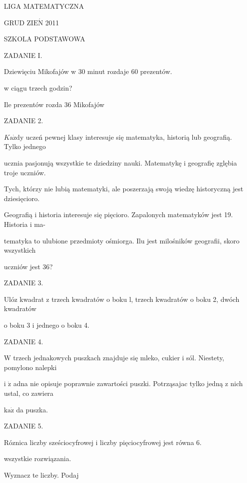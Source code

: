 \documentclass[a4paper,12pt]{article}
\begin{document}
LIGA MATEMATYCZNA

GRUD Z$\mathrm{I}\mathrm{E}\acute{\mathrm{N}}$ 2011

SZKOLA PODSTAWOWA

ZADANIE I.

Dziewięciu Mikofajów w 30 minut rozdaje 60 prezentów.

w ciągu trzech godzin?

Ile prezentów rozda 36 Mikofajów

ZADANIE 2.

$K\mathrm{a}\dot{\mathrm{z}}\mathrm{d}\mathrm{y}$ uczeń pewnej klasy interesuje się matematyka, historią lub geografią. Tylko jednego

ucznia pasjonują wszystkie te dziedziny nauki. Matematykę i geografię zglębia troje uczniów.

Tych, którzy nie lubią matematyki, ale poszerzają swoją wiedzę historyczną jest dziesięcioro.

Geografią i historia interesuje się pięcioro. Zapalonych matematyków jest 19. Historia i ma-

tematyka to ulubione przedmioty ośmiorga. Ilu jest milośników geografii, skoro wszystkich

uczniów jest 36?

ZADANIE 3.

Ulóz kwadrat z trzech kwadratów o boku l, trzech kwadratów o boku 2, dwóch kwadratów

o boku 3 i jednego o boku 4.

ZADANIE 4.

$\mathrm{W}$ trzech jednakowych puszkach znajduje się mleko, cukier i sól. Niestety, pomylono nalepki

i $\dot{\mathrm{z}}$ adna nie opisuje poprawnie zawartości puszki. Potrząsajac tylko jedną z nich ustal, co zawiera

$\mathrm{k}\mathrm{a}\dot{\mathrm{z}}$ da puszka.

ZADANIE 5.

Róznica liczby sześciocyfrowej i liczby pięciocyfrowej jest równa 6.

wszystkie rozwiązania.

Wyznacz te liczby. Podaj
\end{document}
